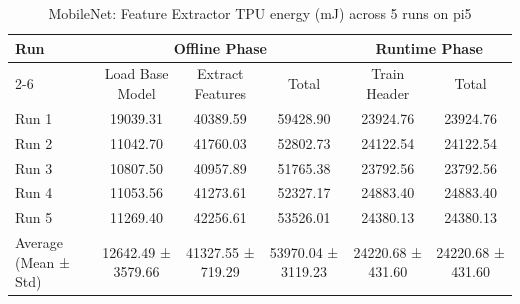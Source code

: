 \begin{table}[t]
\centering
\caption{MobileNet: Feature Extractor TPU energy (mJ) across 5 runs on pi5}
\label{tab:energy_mobilenet_EdgeTPU_pi5}
\begin{tabular}{lccccc}
\hline
\multirow{2}{*}{Run} & \multicolumn{3}{c}{Offline Phase} & \multicolumn{2}{c}{Runtime Phase} \\
\cline{2-6}
 & Load Base Model & Extract Features & Total & Train Header & Total \\
\hline
  Run 1                  & 19039.31       & 40389.59       & 59428.90       & 23924.76       & 23924.76       \\
  Run 2                  & 11042.70       & 41760.03       & 52802.73       & 24122.54       & 24122.54       \\
  Run 3                  & 10807.50       & 40957.89       & 51765.38       & 23792.56       & 23792.56       \\
  Run 4                  & 11053.56       & 41273.61       & 52327.17       & 24883.40       & 24883.40       \\
  Run 5                  & 11269.40       & 42256.61       & 53526.01       & 24380.13       & 24380.13       \\
\hline
  Average (Mean ± Std)   & 12642.49 ± 3579.66 & 41327.55 ± 719.29 & 53970.04 ± 3119.23 & 24220.68 ± 431.60 & 24220.68 ± 431.60 \\
\hline
\end{tabular}
\end{table}
